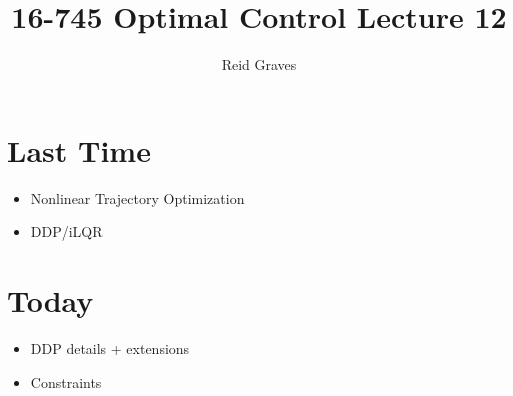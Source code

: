 \documentclass[11pt]{article}
\title{16-745 Optimal Control Lecture 12}
\author{Reid Graves}
\begin{document}
\maketitle

\section{Last Time}
\begin{itemize}
    \item Nonlinear Trajectory Optimization
    \item DDP/iLQR
\end{itemize}

\section{Today}
\begin{itemize}
    \item DDP details + extensions
    \item Constraints
\end{itemize}
\end{document}
